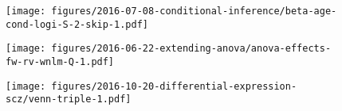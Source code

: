 \documentclass[letterpaper]{article}
\begin{document}
\begin{figure}
\begin{center}
\texttt{[image: figures/2016-07-08-conditional-inference/beta-age-cond-logi-S-2-skip-1.pdf]}
\end{center}
\caption{}
\label{fig:interaction-logi.S}
\end{figure}

\begin{figure}
\begin{center}
\texttt{[image: figures/2016-06-22-extending-anova/anova-effects-fw-rv-wnlm-Q-1.pdf]}
\end{center}
\caption{}
\label{fig:anova}
\end{figure}

\begin{figure}
\begin{center}
\texttt{[image: figures/2016-10-20-differential-expression-scz/venn-triple-1.pdf]}
\end{center}
\caption{}
\label{fig:diff-exp-scz}
\end{figure}



\setcounter{table}{0}
\makeatletter 
\renewcommand{\thetable}{S\@arabic\c@table}
\makeatother
\end{document}
